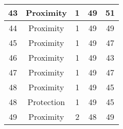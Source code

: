 \documentclass[results.tex]{subfiles}
\begin{document}
\begin{center}
\begin{tabular}{| c || c | c | c | c |}
            \hline
            43                      & Proximity                    & 1                      & 49                      & 51                   \\
            \hline
            44                      & Proximity                    & 1                      & 49                      & 49                   \\
            \hline
            45                      & Proximity                    & 1                      & 49                      & 47                   \\
            \hline
            46                      & Proximity                    & 1                      & 49                      & 43                   \\
            \hline
            47                      & Proximity                    & 1                      & 49                      & 47                   \\
            \hline
            48                      & Proximity                    & 1                      & 49                      & 45                   \\
            \hline
            48                      & Protection                   & 1                      & 49                      & 45                   \\
            \hline
            49                      & Proximity                    & 2                      & 48                      & 49                   \\
            \hline
        \end{tabular}
    \end{center}
\end{document}

